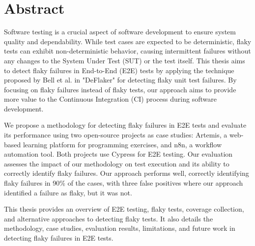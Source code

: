 \chapter{Abstract}

Software testing is a crucial aspect of software development to ensure system quality and dependability. While test cases are expected to be deterministic, flaky tests can exhibit non-deterministic behavior, causing intermittent failures without any changes to the System Under Test (SUT) or the test itself. This thesis aims to detect flaky failures in End-to-End (E2E) tests by applying the technique proposed by Bell et al. in "DeFlaker" for detecting flaky unit test failures. By focusing on flaky failures instead of flaky tests, our approach aims to provide more value to the Continuous Integration (CI) process during software development.

We propose a methodology for detecting flaky failures in E2E tests and evaluate its performance using two open-source projects as case studies: Artemis, a web-based learning platform for programming exercises, and n8n, a workflow automation tool. Both projects use Cypress for E2E testing. Our evaluation assesses the impact of our methodology on test execution and its ability to correctly identify flaky failures. Our approach performs well, correctly identifying flaky failures in 90\% of the cases, with three false positives where our approach identified a failure as flaky, but it was not.

This thesis provides an overview of E2E testing, flaky tests, coverage collection, and alternative approaches to detecting flaky tests. It also details the methodology, case studies, evaluation results, limitations, and future work in detecting flaky failures in E2E tests.

